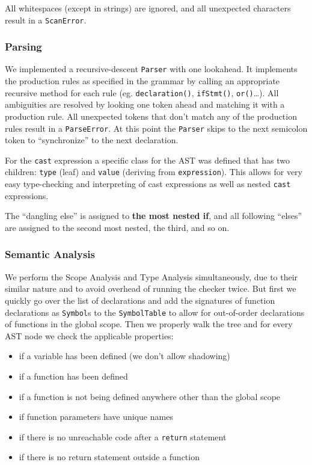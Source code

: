 \documentclass[a4paper,12pt]{article}
\providecommand{\tightlist}{\setlength{\itemsep}{0pt}\setlength{\parskip}{0pt}}
\begin{document}
All whitespaces (except in strings) are ignored, and all unexpected
characters result in a \texttt{ScanError}.

\subsubsection{Parsing}\label{parsing}

We implemented a recursive-descent \texttt{Parser} with one lookahead.
It implements the production rules as specified in the grammar by
calling an appropriate recursive method for each rule (eg.
\texttt{declaration()}, \texttt{ifStmt()}, \texttt{or()}\ldots). All
ambiguities are resolved by looking one token ahead and matching it with
a production rule. All unexpected tokens that don't match any of the
production rules result in a \texttt{ParseError}. At this point the
\texttt{Parser} skips to the next semicolon token to ``synchronize'' to
the next declaration. \newline

For the \texttt{cast} expression a specific class for the AST was
defined that has two children: \texttt{type} (leaf) and \texttt{value}
(deriving from \texttt{expression}). This allows for very easy
type-checking and interpreting of cast expressions as well as nested
\texttt{cast} expressions. \newline

The ``dangling else'' is assigned to \textbf{the most nested if}, and
all following ``elses'' are assigned to the second most nested, the
third, and so on.

\subsubsection{Semantic Analysis}\label{semantic-analysis}

We perform the Scope Analysis and Type Analysis simultaneously, due to
their similar nature and to avoid overhead of running the checker twice.
But first we quickly go over the list of declarations and add the
signatures of function declarations as \texttt{Symbol}s to the
\texttt{SymbolTable} to allow for out-of-order declarations of functions
in the global scope. Then we properly walk the tree and for every AST
node we check the applicable properties:

\begin{itemize}
\tightlist
\item
  if a variable has been defined (we don't allow shadowing)
\item
  if a function has been defined
\item
  if a function is not being defined anywhere other than the global
  scope
\item
  if function parameters have unique names
\item
  if there is no unreachable code after a \texttt{return} statement
\item
  if there is no return statement outside a function
\end{itemize}
\end{document}
